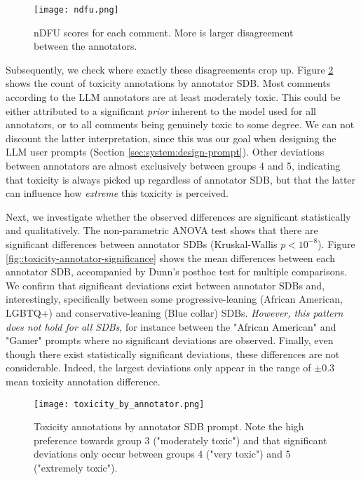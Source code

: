 \begin{figure}
	\centering
	\texttt{[image: ndfu.png]}
	\caption{\ac{nDFU} \cite{pavlopoulos-likas-2024-polarized} scores for each comment. More is larger disagreement between the annotators.}
	\label{fig::toxicity-ndfu}
\end{figure}

Subsequently, we check where exactly these disagreements crop up. Figure \ref{fig::toxicity-annotator} shows the count of toxicity annotations by annotator \ac{SDB}. Most comments according to the LLM annotators are at least moderately toxic. This could be either attributed to a significant \textit{prior} inherent to the model used for all annotators, or to all comments being genuinely toxic to some degree. We can not discount the latter interpretation, since this was our goal when designing the LLM user prompts (Section \ref{sec:system:design-prompt}). Other deviations between annotators are almost exclusively between groups 4 and 5, indicating that toxicity is always picked up regardless of annotator \ac{SDB}, but that the latter can influence how \textit{extreme} this toxicity is perceived.

Next, we investigate whether the observed differences are significant statistically and qualitatively. The non-parametric ANOVA test shows that there are significant differences between annotator \acp{SDB} (Kruskal-Wallis $p<10^{-8}$). Figure \ref{fig::toxicity-annotator-significance} shows the mean differences between each annotator \ac{SDB}, accompanied by Dunn's posthoc test for multiple comparisons. We confirm that significant deviations exist between annotator \acp{SDB} and, interestingly, specifically between some progressive-leaning (African American, LGBTQ+) and conservative-leaning (Blue collar) \acp{SDB}. \textit{However, this pattern does not hold for all \acp{SDB}}, for instance between the "African American" and "Gamer" prompts where no significant deviations are observed. Finally, even though there exist statistically significant deviations, these differences are not considerable. Indeed, the largest deviations only appear in the range of $\pm 0.3$ mean toxicity annotation difference.

\begin{figure}
	\centering
	\texttt{[image: toxicity\_by\_annotator.png]}
	\caption{Toxicity annotations by annotator \ac{SDB} prompt. Note the high preference towards group 3 ("moderately toxic") and that significant deviations only occur between groups 4 ("very toxic") and 5 ("extremely toxic").}
	\label{fig::toxicity-annotator}
\end{figure}

